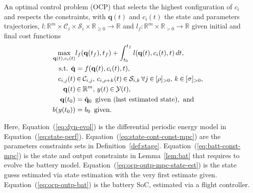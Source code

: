 \documentclass[letterpaper,10pt,journal,twoside]{IEEEtran}
\theoremstyle{definition}
\begin{document}
An optimal control problem (OCP) that selects the highest configuration of $c_i$ and respects the constraints, with $\mathbf{q}(t)$ and $c_i(t)$ the state and parameters trajectories, $l:\mathbb{R}^m\times\mathcal{C}_i\times\mathcal{S}_i\times\mathbb{R}_{\geq 0}\rightarrow\mathbb{R}$ and $l_f:\mathbb{R}^m\times\mathbb{R}_{> 0}\rightarrow\mathbb{R}$ given initial and final cost functions
\begin{subequations}\label{eq:ocp-output-mpc}\begin{align}
  \max_{\mathbf{q}(t),c_i(t)}&{l_f(\mathbf{q}(t_f),t_f)+\int_{t_0}^{t_f}{l(\mathbf{q}(t),c_i(t),t)\,dt}},\label{eq:ocp-costs}\\
  \text{s.t. }\dot{\mathbf{q}}&=f(\mathbf{q}(t),c_i(t),t),\label{eq:dyn-evol}\\
  c_{i,j}(t)&\hspace*{-.2ex}\in\hspace*{-.2ex}\mathcal{C}_{i,j},\,c_{i,\rho+k}(t)\hspace*{-.2ex}\in\hspace*{-.2ex}\mathcal{S}_{i,k}\,\forall j\hspace*{-.2ex}\in\hspace*{-.2ex}[\rho]_{>0},\,k\hspace*{-.2ex}\in\hspace*{-.2ex}[\sigma]_{>0},\label{eq:state-cont-const-mpc}\\
  \mathbf{q}(t)&\hspace*{-.2ex}\in\hspace*{-.2ex}\mathbb{R}^m,\,y(t)\hspace*{-.2ex}\in\hspace*{-.2ex}\mathcal{Y}(t),\label{eq:batt-const-mpc}\\
  \mathbf{q}(t_0)&=\hat{\mathbf{q}}_0\,\,\,\text{given (last estimated state)},\text{ and}\label{eq:ocp-outp-mpc-state-est}\\
  b(y(t_0))&=b_0\,\,\,\text{given}\label{eq:ocp-outp-bat}.
\end{align}\end{subequations}

Here, Equation~(\ref{eq:dyn-evol}) is the differential periodic energy model in Equation~(\ref{eq:state-perf}). Equation~(\ref{eq:state-cont-const-mpc}) are the parameters constraints sets in Definition~\ref{def:stage}. Equation~(\ref{eq:batt-const-mpc}) is the state and output constraints in Lemma~\ref{lem:bat} that requires to evolve the battery model. Equation~(\ref{eq:ocp-outp-mpc-state-est}) is the state guess estimated via state estimation%
with the very first estimate given. Equation~(\ref{eq:ocp-outp-bat}) is the battery SoC, estimated via a flight controller.
\end{document}
